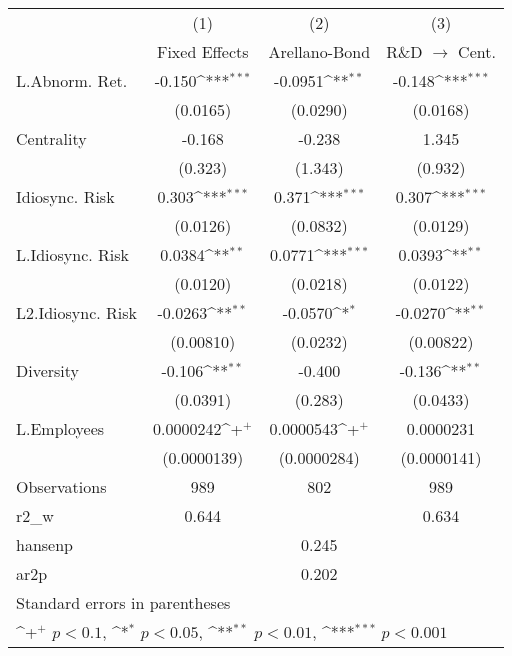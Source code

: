 {
\def\sym#1{\ifmmode^{#1}\else\(^{#1}\)\fi}
\begin{tabular}{l*{3}{c}}
\hline\hline
                    &\multicolumn{1}{c}{(1)}&\multicolumn{1}{c}{(2)}&\multicolumn{1}{c}{(3)}\\
                    &\multicolumn{1}{c}{Fixed Effects}&\multicolumn{1}{c}{Arellano-Bond}&\multicolumn{1}{c}{R\&D $\rightarrow$ Cent.}\\
\hline
L.Abnorm. Ret.      &      -0.150\sym{***}&     -0.0951\sym{**} &      -0.148\sym{***}\\
                    &    (0.0165)         &    (0.0290)         &    (0.0168)         \\
Centrality          &      -0.168         &      -0.238         &       1.345         \\
                    &     (0.323)         &     (1.343)         &     (0.932)         \\
Idiosync. Risk      &       0.303\sym{***}&       0.371\sym{***}&       0.307\sym{***}\\
                    &    (0.0126)         &    (0.0832)         &    (0.0129)         \\
L.Idiosync. Risk    &      0.0384\sym{**} &      0.0771\sym{***}&      0.0393\sym{**} \\
                    &    (0.0120)         &    (0.0218)         &    (0.0122)         \\
L2.Idiosync. Risk   &     -0.0263\sym{**} &     -0.0570\sym{*}  &     -0.0270\sym{**} \\
                    &   (0.00810)         &    (0.0232)         &   (0.00822)         \\
Diversity           &      -0.106\sym{**} &      -0.400         &      -0.136\sym{**} \\
                    &    (0.0391)         &     (0.283)         &    (0.0433)         \\
L.Employees         &   0.0000242\sym{+}  &   0.0000543\sym{+}  &   0.0000231         \\
                    & (0.0000139)         & (0.0000284)         & (0.0000141)         \\
\hline
Observations        &         989         &         802         &         989         \\
r2\_w                &       0.644         &                     &       0.634         \\
hansenp             &                     &       0.245         &                     \\
ar2p                &                     &       0.202         &                     \\
\hline\hline
\multicolumn{4}{l}{\footnotesize Standard errors in parentheses}\\
\multicolumn{4}{l}{\footnotesize \sym{+} \(p<0.1\), \sym{*} \(p<0.05\), \sym{**} \(p<0.01\), \sym{***} \(p<0.001\)}\\
\end{tabular}
}
